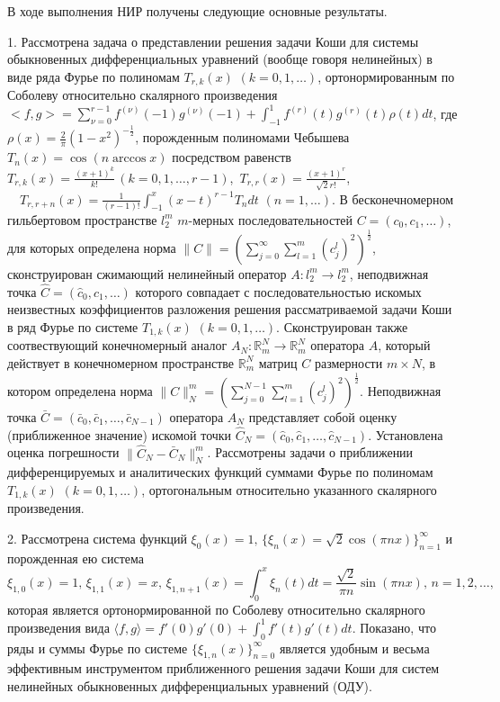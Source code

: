 \Conclusion

В ходе выполнения НИР получены следующие основные результаты.

1. Рассмотрена задача о представлении решения задачи Коши для системы  обыкновенных  дифференциальных  уравнений (вообще говоря нелинейных) в виде  ряда  Фурье по полиномам $T_{r,k}(x)$ $(k=0,1,\ldots)$, ортонормированным по Соболеву относительно скалярного произведения
$<f,g>=\sum_{\nu=0}^{r-1}f^{(\nu)}(-1)g^{(\nu)}(-1)+\int_{-1}^1 f^{(r)}(t)g^{(r)}(t)\rho(t)dt$, где $\rho(x)=\frac2\pi(1-x^2)^{-\frac12}$, порожденным полиномами Чебышева $T_n(x)=\cos(n\arccos x)$ посредством равенств $T_{r,k}(x) =\frac{(x+1)^k}{k!}\, ( k=0,1,\ldots, r-1)$,\, $T_{r,r}(x) =\frac{(x+1)^r}{\sqrt{2}r!}$,\, $\quad T_{r,r+n}(x) =\frac{1}{(r-1)!}\int_{-1}^x(x-t)^{r-1}T_{n}dt\,\, ( n=1,\ldots)$.  В бесконечномерном гильбертовом  пространстве $l_2^m$ $m$-мерных последовательностей  $C=(c_0,c_1,\ldots)$, для которых определена норма
$\|C\|=\left(\sum\nolimits_{j=0}^\infty \sum\nolimits_{l=1}^{m}(c_j^l)^2\right)^\frac12$, сконструирован сжимающий нелинейный оператор  $A: l_2^m\to l_2^m$,  неподвижная точка $\hat C=(\hat c_0,\hat c_1,\ldots)$ которого совпадает с последовательностью  искомых неизвестных коэффициентов разложения решения рассматриваемой задачи Коши в ряд Фурье по системе $T_{1,k}(x)$ $(k=0,1,\ldots)$. Сконструирован также соотвествующий конечномерный аналог $A_N:\mathbb{R}^N_m\to \mathbb{R}^N_m$ оператора $A$, который действует в конечномерном пространстве  $\mathbb{R}^N_m$ матриц $C$ размерности $m\times N$, в котором определена норма
$\|C\|_N^m=\left(\sum\nolimits_{j=0}^{N-1} \sum\nolimits_{l=1}^{m}(c_j^l)^2\right)^\frac12$. Неподвижная точка $\bar C=(\bar c_0,\bar c_1,\ldots, \bar c_{N-1})$ оператора $A_N$ представляет собой оценку (приближенное значение) искомой точки $\hat C_N=(\hat c_0,\hat c_1,\ldots, \hat c_{N-1})$. Установлена оценка погрешности $\|\hat C_N-\bar C_N\|_N^m$. Рассмотрены задачи о приближении дифференцируемых и аналитических функций суммами Фурье по полиномам $T_{1,k}(x)$ $(k=0,1,\ldots)$, ортогональным относительно указанного скалярного произведения.


2. Рассмотрена система функций  $\xi_0(x)=1,\, \{\xi_n(x)=\sqrt{2}\cos(\pi nx)\}_{n=1}^\infty$ и порожденная ею система
$$
\xi_{1,0}(x)=1,\, \xi_{1,1}(x)=x,\, \xi_{1,n+1}(x)=\int_0^x \xi_{n}(t)dt=\frac{\sqrt{2}}{\pi n}\sin(\pi nx),\, n=1,2,\ldots,
$$
которая является ортонормированной по Соболеву относительно скалярного произведения  вида $\langle f,g \rangle =f'(0)g'(0)+\int_{0}^{1}f'(t)g'(t)dt$. Показано, что ряды и суммы Фурье по системе $\{\xi_{1,n}(x)\}_{n=0}^\infty$  является удобным и весьма эффективным инструментом приближенного решения задачи Коши для систем нелинейных обыкновенных дифференциальных уравнений (ОДУ).

